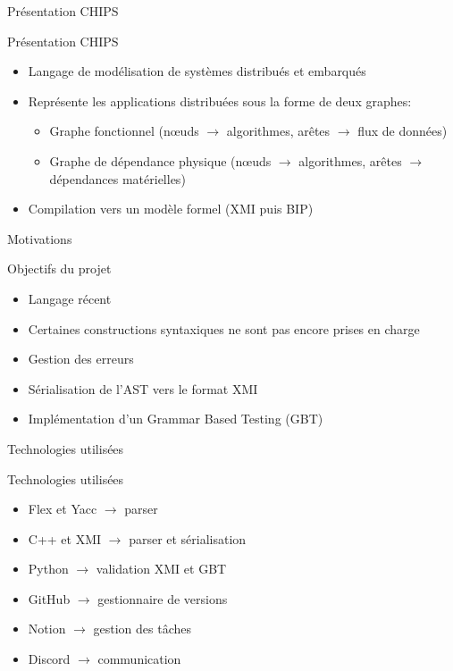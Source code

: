\begin{frame}{Présentation CHIPS}
    \begin{block}{Présentation CHIPS}
        \begin{itemize}
            \item Langage de modélisation de systèmes distribués et embarqués
            \item Représente les applications distribuées sous la forme de deux graphes:
            \begin{itemize}
                \item Graphe fonctionnel (nœuds $\rightarrow$ algorithmes, arêtes $\rightarrow$ flux de données)
                \item Graphe de dépendance physique (nœuds $\rightarrow$ algorithmes, arêtes $\rightarrow$ dépendances matérielles)
            \end{itemize}
            \item Compilation vers un modèle formel (XMI puis BIP)
        \end{itemize}
    \end{block}
\end{frame}

\begin{frame}{Motivations}
   \begin{block}{Objectifs du projet}
        \begin{itemize}
            \item Langage récent
            \item Certaines constructions syntaxiques ne sont pas encore prises en charge
            \item Gestion des erreurs
            \item Sérialisation de l'AST vers le format XMI
            \item Implémentation d'un Grammar Based Testing (GBT)
        \end{itemize}
    \end{block}
\end{frame}

\begin{frame}{Technologies utilisées}
    \begin{block}{Technologies utilisées}
        \begin{itemize}
            \item Flex et Yacc $\rightarrow$ parser
            \item C++ et XMI $\rightarrow$ parser et sérialisation
            \item Python $\rightarrow$ validation XMI et GBT
            \item GitHub $\rightarrow$ gestionnaire de versions
            \item Notion $\rightarrow$ gestion des tâches
            \item Discord $\rightarrow$ communication
        \end{itemize}
    \end{block}
\end{frame}